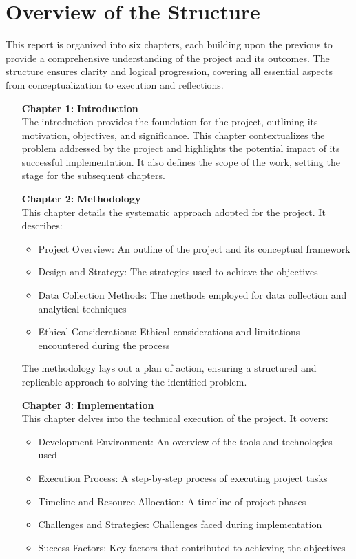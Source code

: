 \section{Overview of the Structure}
This report is organized into six chapters, each building upon the previous to provide a comprehensive understanding of the project and its outcomes. The structure ensures clarity and logical progression, covering all essential aspects from conceptualization to execution and reflections.

\begin{itemize}[leftmargin=2.15cm, labelwidth=1.5cm]
    \item[\textbf{Chapter 1:}] \textbf{Introduction}\\
    The introduction provides the foundation for the project, outlining its motivation, objectives, and significance. This chapter contextualizes the problem addressed by the project and highlights the potential impact of its successful implementation. It also defines the scope of the work, setting the stage for the subsequent chapters.

    \item[\textbf{Chapter 2:}] \textbf{Methodology}\\
    This chapter details the systematic approach adopted for the project. It describes:
    \begin{itemize}
        \item Project Overview: An outline of the project and its conceptual framework
        \item Design and Strategy: The strategies used to achieve the objectives
        \item Data Collection Methods: The methods employed for data collection and analytical techniques
        \item Ethical Considerations: Ethical considerations and limitations encountered during the process
    \end{itemize}
    The methodology lays out a plan of action, ensuring a structured and replicable approach to solving the identified problem.

    \item[\textbf{Chapter 3:}] \textbf{Implementation}\\
    This chapter delves into the technical execution of the project. It covers:
    \begin{itemize}
        \item Development Environment: An overview of the tools and technologies used
        \item Execution Process: A step-by-step process of executing project tasks
        \item Timeline and Resource Allocation: A timeline of project phases
        \item Challenges and Strategies: Challenges faced during implementation
        \item Success Factors: Key factors that contributed to achieving the objectives
    \end{itemize}


\end{itemize}
